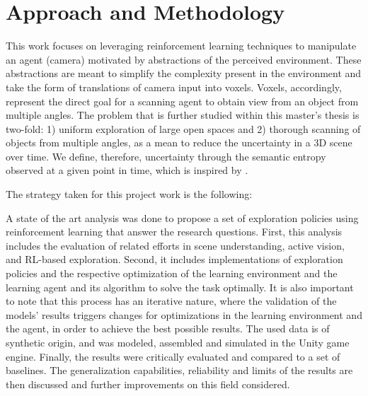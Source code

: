 \section{Approach and Methodology}\label{chap:1:approach-methodology}
This work focuses on leveraging reinforcement learning techniques to manipulate an agent (camera) motivated by abstractions of the perceived environment. These abstractions are meant to simplify the complexity present in the environment and take the form of translations of camera input into voxels. Voxels, accordingly, represent the direct goal for a scanning agent to obtain view from an object from multiple angles. The problem that is further studied within this master's thesis is two-fold: 1) uniform exploration of large open spaces and 2) thorough scanning of objects from multiple angles, as a mean to reduce the uncertainty in a 3D scene over time. We define, therefore, uncertainty through the semantic entropy observed at a given point in time, which is inspired by \textcite{chaplot2020semantic}.

The strategy taken for this project work is the following:

A state of the art analysis was done to propose a set of exploration policies using reinforcement learning that answer the research questions. 
First, this analysis includes the evaluation of related efforts in scene understanding, active vision, and RL-based exploration.
Second, it includes implementations of exploration policies and the respective optimization of the learning environment and the learning agent and its algorithm to solve the task optimally. 
It is also important to note that this process has an iterative nature, where the validation of the models' results triggers changes for optimizations in the learning environment and the agent, 
in order to achieve the best possible results. The used data is of synthetic origin, and was modeled, assembled and simulated in the Unity game engine. Finally, the results were critically evaluated and compared to a set of baselines. The generalization capabilities, reliability and limits of the results are then discussed and further improvements on this field considered. 

